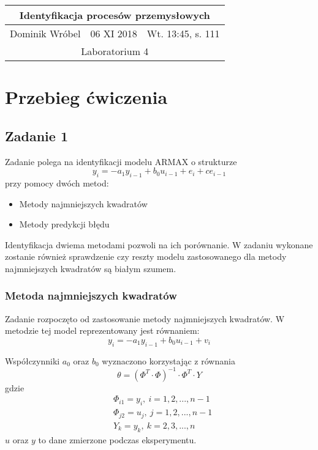 \documentclass[a4paper,15pt]{article}
\begin{document}

\begin{table}
\begin{center}
\begin{tabular}{|l|l|l|}
\hline
\multicolumn{3}{|c|}{\textbf{Identyfikacja procesów przemysłowych}} \\ \hline Dominik Wróbel & 06 XI 2018 & Wt. 13:45, s. 111 \\ \hline
\multicolumn{3}{|c|}{Laboratorium 4} \\ \hline 
\end{tabular}
\end{center}
\end{table}


\section{Przebieg ćwiczenia}
\subsection{Zadanie 1 }

Zadanie polega na identyfikacji modelu ARMAX o strukturze 
\begin{equation*}
y_i = -a_1y_{i-1} + b_0u_{i-1} + e_i + ce_{i-1}
\end{equation*}
przy pomocy dwóch metod:
\begin{itemize}
\item Metody najmniejszych kwadratów
\item Metody predykcji błędu
\end{itemize}
Identyfikacja dwiema metodami pozwoli na ich porównanie. W zadaniu wykonane zostanie również sprawdzenie czy reszty modelu zastosowanego dla metody najmniejszych kwadratów są białym szumem. 

\subsubsection{Metoda najmniejszych kwadratów}
Zadanie rozpoczęto od zastosowanie metody najmniejszych kwadratów. W metodzie tej model reprezentowany jest równaniem:
\begin{equation*}
y_i = -a_1y_{i-1} + b_0u_{i-1} + v_i
\end{equation*}

Współczynniki \( a_0 \) oraz \( b_0 \) wyznaczono korzystając z równania
\begin{equation}\label{01_eq}
\theta =  ( \Phi ^T \cdot \Phi )^{-1} \cdot \Phi ^T \cdot Y 
\end{equation}
gdzie
\begin{align*}
& \Phi _{i1} = y_i, \ i=1,2,...,n-1 \\
& \Phi _{j2} = u_j, \ j=1,2,...,n-1 \\
& Y _k = y_k, \ k=2,3,...,n
\end{align*}
\( u \) oraz \( y \) to dane zmierzone podczas eksperymentu. 
\end{document}
